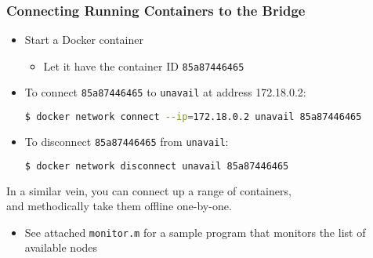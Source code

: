 \begin{frame}[fragile]

\frametitle{Connecting Running Containers to the Bridge}

\begin{itemize}

\item Start a Docker container

\begin{itemize}

\item Let it have the container ID \texttt{85a87446465}

\end{itemize}

\item To connect \texttt{85a87446465} to \texttt{unavail} at address
172.18.0.2:

\begin{lstlisting}[language=bash]
$ docker network connect --ip=172.18.0.2 unavail 85a87446465
\end{lstlisting}

\item To disconnect \texttt{85a87446465} from \texttt{unavail}:

\begin{lstlisting}[language=bash]
$ docker network disconnect unavail 85a87446465
\end{lstlisting}

\end{itemize}

\begin{center}

In a similar vein, you can connect up a range of containers,\\ and
methodically take them offline one-by-one.

\end{center}

\begin{itemize}

\item See attached \texttt{monitor.m} for a sample program that
monitors the list of available nodes

\end{itemize}

\end{frame}

